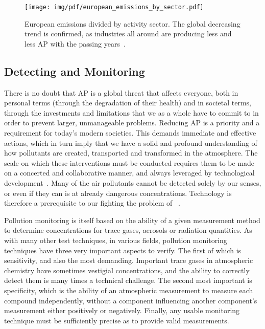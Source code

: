 \begin{figure}[htpb]
    \centering
    \texttt{[image: img/pdf/european\_emissions\_by\_sector.pdf]}
    \caption{European emissions divided by activity sector. The global
    decreasing trend is confirmed, as industries all around are
    producing less and less \gls{AP} with the passing years~\cite{EEA2019}.}
    \label{fig:european_emissions_by_sector}
\end{figure}

\subsection{Detecting and Monitoring }%
\label{sub:detecting_and_monitoring_ap}

There is no doubt that \gls{AP} is a global threat that affects
everyone, both in personal terms (through the degradation of their
health) and in societal terms, through the investments and limitations
that we as a whole have to commit to in order to prevent larger,
unmanageable problems. Reducing \gls{AP} is a priority and a requirement
for today's modern societies. This demands immediate and effective
actions, which in turn imply that we have a solid and profound
understanding of how pollutants are created, transported and transformed
in the atmosphere. The scale on which these interventions must be
conducted requires them to be made on a concerted and collaborative
manner, and always leveraged by technological
development~\cite{EEA2019}. Many of the air pollutants cannot be
detected solely by our senses, or even if they can is at already
dangerous concentrations. Technology is therefore a prerequisite to our
fighting the problem of ~\cite{Vallero2014}.

Pollution monitoring is itself based on the ability of a given
measurement method to determine concentrations for trace gases, aerosols
or radiation quantities. As with many other test techniques, in various
fields, pollution monitoring techniques have three very important
aspects to verify. The first of which is sensitivity, and also the most
demanding. Important trace gases in atmospheric chemistry have sometimes
vestigial concentrations, and the ability to correctly detect them is
many times a technical challenge. The second most important is
specificity, which is the ability of an atmospheric measurement to
measure each compound independently, without a component influencing
another component's measurement either positively or negatively.
Finally, any usable monitoring technique must be sufficiently precise as
to provide valid measurements.

